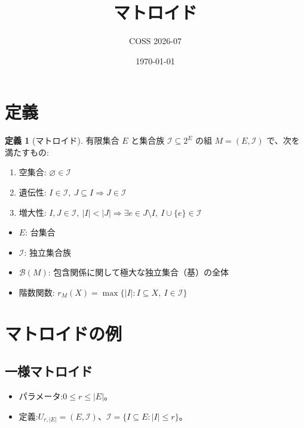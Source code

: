 \documentclass[a4paper, 11pt, dvipdfmx]{jsarticle}
\title{マトロイド}
\author{COSS 2026-07}
\date{\today}
\theoremstyle{definition}
\newtheorem{definition}[theorem]{定義}
\begin{document}
\maketitle

\section{定義}
\label{sec:matroid-definition}

\begin{definition}[マトロイド]
\label{def:matroid}
有限集合 $E$ と集合族 $\mathcal{I} \subseteq 2^E$ の組 $M = (E, \mathcal{I})$ で、次を満たすもの:
\begin{enumerate}
  \item 空集合: $\varnothing \in \mathcal{I}$
  \item 遺伝性: $I \in \mathcal{I},\ J \subseteq I \Longrightarrow J \in \mathcal{I}$
  \item 増大性: $I, J \in \mathcal{I},\ \lvert I \rvert < \lvert J \rvert \Longrightarrow \exists e \in J \setminus I,\ I \cup \{e\} \in \mathcal{I}$
\end{enumerate}
\end{definition}

\begin{itemize}
  \item $E$: 台集合
  \item $\mathcal{I}$: 独立集合族
  \item $\mathcal{B}(M)$: 包含関係に関して極大な独立集合（基）の全体
  \item 階数関数: $r_M(X) = \max\{\lvert I \rvert : I \subseteq X,\ I \in \mathcal{I}\}$
\end{itemize}

\section{マトロイドの例}
\label{sec:matroid-examples}

\subsection[一様マトロイド]{一様マトロイド~\citep{s1}}
\label{sec:uniform-matroid}

\begin{itemize}
  \item パラメータ:$0 \leq r \leq \lvert E \rvert$。
  \item 定義:$U_{r, \lvert E \rvert} = (E, \mathcal{I})$、$\mathcal{I} = \{I \subseteq E : \lvert I \rvert \leq r\}$。
\end{itemize}
\end{document}
